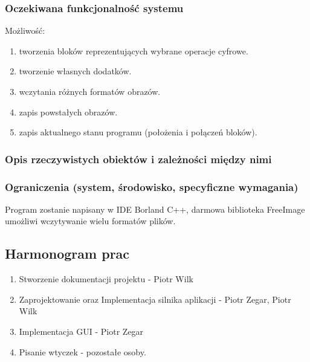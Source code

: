 \subsubsection{Oczekiwana funkcjonalność systemu}
Możliwość:
\begin{enumerate}
 \item tworzenia bloków reprezentujących wybrane operacje cyfrowe.
 \item tworzenie własnych dodatków.
 \item wczytania różnych formatów obrazów.
 \item zapis powstałych obrazów.
 \item zapis aktualnego stanu programu (położenia i połączeń bloków).
\end{enumerate}
\subsubsection{Opis rzeczywistych obiektów i zależności między nimi}

\subsubsection{Ograniczenia (system, środowisko, specyficzne wymagania)}
Program zostanie napisany w IDE Borland C++, darmowa biblioteka FreeImage umożliwi wczytywanie wielu formatów plików.
\subsection{Harmonogram prac}
\begin{enumerate}
 \item Stworzenie dokumentacji projektu - Piotr Wilk
 \item Zaprojektowanie oraz Implementacja silnika aplikacji - Piotr Zegar, Piotr Wilk
 \item Implementacja GUI - Piotr Zegar
 \item Pisanie wtyczek - pozostałe osoby.
\end{enumerate}

